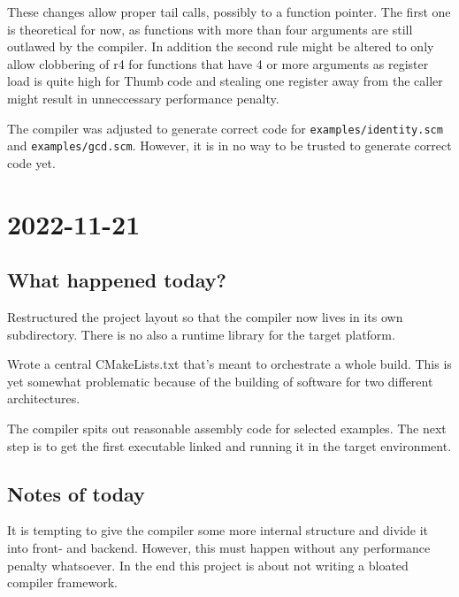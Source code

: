 \documentclass[12pt, article]{article}
\begin{document}
These changes allow proper tail calls, possibly to a function
pointer.
The first one is theoretical for now, as functions with more than four
arguments are still outlawed by the compiler.
In addition the second rule might be altered to only allow clobbering
of r4 for functions that have 4 or more arguments as register load is
quite high for Thumb code and stealing one register away from the
caller might result in unneccessary performance penalty.

The compiler was adjusted to generate correct code for
\texttt{examples/identity.scm} and \texttt{examples/gcd.scm}.
However, it is in no way to be trusted to generate correct code yet.

\section{2022-11-21}

\subsection{What happened today?}

Restructured the project layout so that the compiler now lives in its
own subdirectory.
There is no also a runtime library for the target platform.

Wrote a central CMakeLists.txt that's meant to orchestrate a whole
build.
This is yet somewhat problematic because of the building of software
for two different architectures.

The compiler spits out reasonable assembly code for selected
examples.
The next step is to get the first executable linked and running it in
the target environment.

\subsection{Notes of today}

It is tempting to give the compiler some more internal structure and
divide it into front- and backend.
However, this must happen without any performance penalty whatsoever.
In the end this project is about not writing a bloated compiler
framework.
\end{document}
